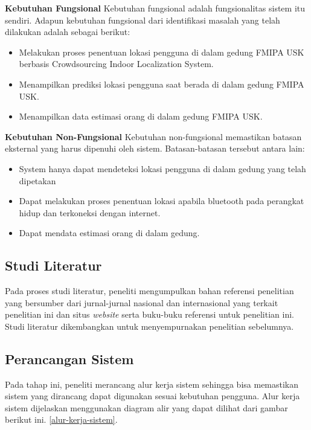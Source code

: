 \par \textbf{Kebutuhan Fungsional} Kebutuhan fungsional adalah fungsionalitas sistem itu sendiri. Adapun kebutuhan fungsional dari identifikasi masalah yang telah dilakukan adalah sebagai berikut:

\begin{itemize}
	\item Melakukan proses penentuan lokasi pengguna di dalam gedung FMIPA USK berbasis Crowdsourcing Indoor Localization System.

	\item Menampilkan prediksi lokasi pengguna saat berada di dalam gedung FMIPA USK.

	\item Menampilkan data estimasi orang di dalam gedung FMIPA USK.

\end{itemize}

\par \textbf{Kebutuhan Non-Fungsional} Kebutuhan non-fungsional memastikan batasan eksternal yang harus dipenuhi oleh sistem. Batasan-batasan tersebut antara lain:
\begin{itemize}
	\item System hanya dapat mendeteksi lokasi pengguna di dalam gedung yang telah dipetakan

	\item Dapat melakukan proses penentuan lokasi apabila bluetooth pada perangkat hidup dan terkoneksi dengan internet.

	\item Dapat mendata estimasi orang di dalam gedung.

\end{itemize}



\subsection{Studi Literatur}
Pada proses studi literatur, peneliti mengumpulkan bahan referensi penelitian yang bersumber dari jurnal-jurnal nasional dan internasional yang terkait penelitian ini dan situs \textit{website} serta buku-buku referensi untuk penelitian ini. Studi literatur dikembangkan untuk menyempurnakan penelitian sebelumnya.

\subsection{Perancangan Sistem}
Pada tahap ini, peneliti merancang alur kerja  sistem sehingga bisa memastikan sistem yang dirancang dapat digunakan sesuai kebutuhan pengguna. Alur kerja sistem dijelaskan menggunakan diagram alir yang dapat dilihat dari gambar berikut ini.
\ref{alur-kerja-sistem}.

